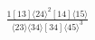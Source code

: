 \documentclass[varwidth, border=5pt]{standalone}
\begin{document}
\begin{my}
$\begin{gathered}
\scriptscriptstyle\frac{1[13]⟨24⟩^2[14]⟨15⟩}{⟨23⟩⟨34⟩[34]⟨45⟩^3}
\end{gathered}$
\end{my}
\end{document}
